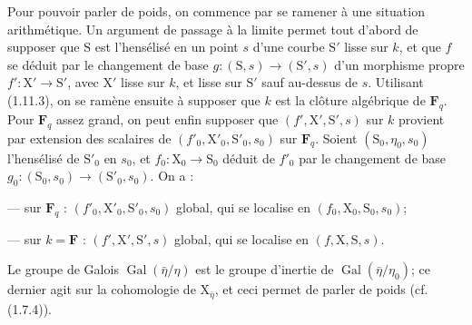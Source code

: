 \documentclass[11pt,leqno]{article}
\begin{document}
Pour pouvoir parler de poids, on commence par se ramener à une situation arithmétique. Un argument de passage à la limite permet tout d’abord de supposer que \(\mathrm S\) est l’hensélisé en un point \(s\) d’une courbe \(\mathrm S'\) lisse sur \(k\), et que \(f\) se déduit par le changement de base \(g:(\mathrm S,s)\to(\mathrm S',s)\) d’un morphisme propre \(f':\mathrm X'\to\mathrm S'\), avec \(\mathrm X'\) lisse sur \(k\), et lisse sur \(\mathrm S'\) sauf au-dessus de \(s\). Utilisant (1.11.3), on se ramène ensuite à supposer que \(k\) est la clôture algébrique de \(\mathbf F_q\). Pour \(\mathbf F_q\) assez grand, on peut enfin supposer que \((f',\mathrm X',\mathrm S',s)\) sur \(k\) provient par extension des scalaires de \((f'_0,\mathrm X'_0,\mathrm S'_0,s_0)\) sur \(\mathbf F_q\). Soient \((\mathrm S_0,\eta_0,s_0)\) l’hensélisé de \(\mathrm S'_0\) en \(s_0\), et \(f_0:\mathrm X_0\to\mathrm S_0\) déduit de \(f'_0\) par le changement de base \(g_0:(\mathrm S_0,s_0)\to(\mathrm S'_0,s_0)\). On a :

\noindent — sur \(\mathbf F_q\) : \((f'_0,\mathrm X'_0,\mathrm S'_0,s_0)\) global, qui se localise en \((f_0,\mathrm X_0,\mathrm S_0,s_0)\);

\noindent — sur \(k=\mathbf F\) : \((f',\mathrm X',\mathrm S',s)\) global, qui se localise en \((f,\mathrm X,\mathrm S,s)\).

Le groupe de Galois \(\operatorname{Gal}(\bar\eta/\eta)\) est le groupe d’inertie de \(\operatorname{Gal}(\bar\eta/\eta_0)\); ce dernier agit sur la cohomologie de \(\mathrm X_{\bar\eta}\), et ceci permet de parler de poids (cf. (1.7.4)).
\end{document}
